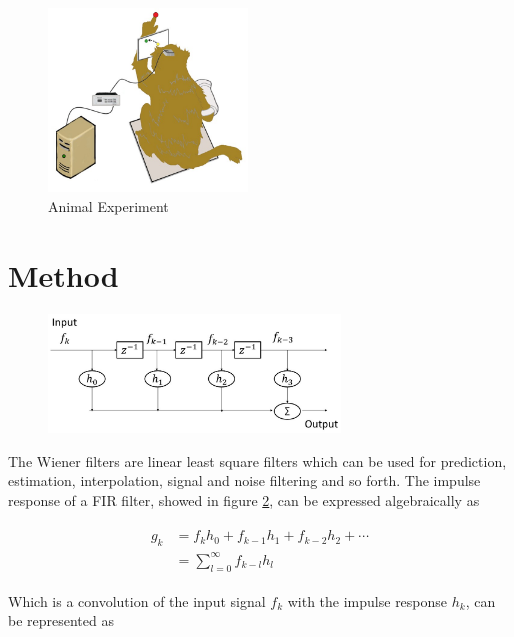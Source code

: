 \documentclass[8pt,a4paper]{article}
\begin{document}
\begin{multicols}{2}
\begin{figure}[H]
  \begin{center}
      \includegraphics[width=150pt]{./Figures/monkey.jpg}
      \caption{Animal Experiment}
      \label{fig:monkey_drawing}
  \end{center}
\end{figure}


\section*{Method}

\begin{figure}[H]
  \begin{center}
      \includegraphics[width=220pt]{./Figures/fir.jpg}
      \caption{}
      \label{fig:fir_filter}
  \end{center}
\end{figure}

The Wiener filters are linear least square filters which can be used for prediction, estimation, interpolation, signal and noise filtering and so forth.\cite{widrow1987}
The impulse response of a FIR filter, showed in figure \ref{fig:fir_filter}, can be expressed algebraically as 

\begin{align}
  \begin{split}
  g_{k} &= f_{k}h_{0} + f_{k-1}h_{1} + f_{k-2}h_{2} + \cdots \\
        &= \sum_{l=0}^{\infty} f_{k-l}h_{l}
  \end{split}
\end{align}

Which is a convolution of the input signal $f_{k}$ with the impulse response $h_{k}$, can be represented as


\end{multicols}
\end{document}
